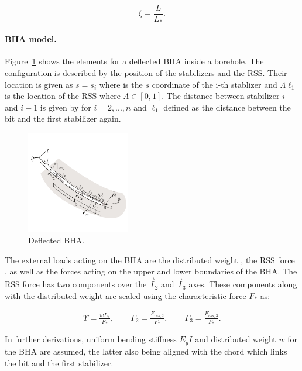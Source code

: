 \begin{equation}
	\xi = \frac{L}{L_*}.
\end{equation}

\paragraph{BHA model.} Figure~\ref{fig:BHAmodel} shows the elements for a deflected BHA inside a borehole. The configuration is described by the position of the stabilizers and the RSS. Their location is given as $s = s_i$ where  is the $s$ coordinate of the i-th stablizer and $\Lambda \ell_1$ is the location of the RSS where $\Lambda \in [0,1]$. The distance between stabilizer $i$ and $i-1$ is given by  for $i = 2,...,n$ and $\ell_1$ defined as the distance between the bit and the first stabilizer again.

\begin{figure}[ht]\centering
	\includegraphics[width=0.4\textwidth]{img/BHAmodel.pdf}
	\caption{\label{fig:BHAmodel}Deflected BHA.}
\end{figure}

The external loads acting on the BHA are the distributed weight , the RSS force , as well as the forces acting on the upper and lower boundaries of the BHA. The RSS force has two components over the $\vec{I}_2$ and $\vec{I}_3$ axes. These components along with the distributed weight are scaled using the characteristic force $F_*$ as:

\begin{align}
\Upsilon = \frac{w L_*}{F_*}, \qquad \Gamma_2 = \frac{F_{rss,2}}{F_*}, \qquad \Gamma_3 = \frac{F_{rss,3}}{F_*}.
\end{align}

In further derivations, uniform bending stiffness $E_y I$ and distributed weight $w$ for the BHA are assumed, the latter also being aligned with the chord  which links the bit and the first stabilizer.

